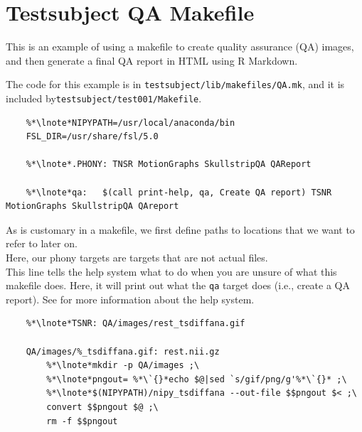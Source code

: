 \section{Testsubject QA Makefile}
\label{example:testsubjectQA}

This is an example of using a makefile to create quality assurance (QA) images, and then generate a final QA report in HTML using R Markdown. 

The code for this example is in \texttt{testsubject/lib/makefiles/QA.mk}, and it is included by\linebreak \texttt{testsubject/test001/Makefile}.

\setcounter{codehighlight}{0} %
\begin{lstlisting}
	%*\lnote*NIPYPATH=/usr/local/anaconda/bin
	FSL_DIR=/usr/share/fsl/5.0

	%*\lnote*.PHONY: TNSR MotionGraphs SkullstripQA QAReport

	%*\lnote*qa:   $(call print-help, qa, Create QA report) TSNR MotionGraphs SkullstripQA QAreport
\end{lstlisting}

\noindent{} As is customary in a makefile, we first define paths
to locations that we want to refer to later on. \\
 Here, our phony targets are targets that are not actual files.\\
 This line tells the \maken{} help system what to do when you
are unsure of what this makefile does. Here, it will print out what
the \texttt{qa} target does (i.e., create a QA report). See  for more information about the help system. \\

\begin{lstlisting}
	%*\lnote*TSNR: QA/images/rest_tsdiffana.gif

	QA/images/%_tsdiffana.gif: rest.nii.gz
		%*\lnote*mkdir -p QA/images ;\
		%*\lnote*pngout= %*\`{}*echo $@|sed `s/gif/png/g'%*\`{}* ;\
		%*\lnote*$(NIPYPATH)/nipy_tsdiffana --out-file $$pngout $< ;\
		convert $$pngout $@ ;\
		rm -f $$pngout
\end{lstlisting}

